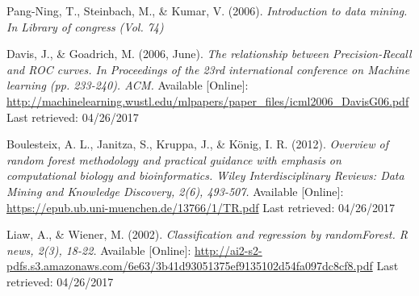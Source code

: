 \documentclass[12pt,a4paper]{article}
\begin{document}
\begin{thebibliography}{9}
		Pang-Ning, T., Steinbach, M., \& Kumar, V. (2006).  
		\textit{Introduction to data mining. In Library of congress (Vol. 74) }

		Davis, J., \& Goadrich, M. (2006, June). 
		\textit{The relationship between Precision-Recall and ROC curves. In Proceedings of the 23rd international conference on Machine learning (pp. 233-240). ACM.}
		Available [Online]: \url{http://machinelearning.wustl.edu/mlpapers/paper_files/icml2006_DavisG06.pdf} Last retrieved: 04/26/2017

		Boulesteix, A. L., Janitza, S., Kruppa, J., \& König, I. R. (2012).
		\textit{Overview of random forest methodology and practical guidance with emphasis on computational biology and bioinformatics. Wiley Interdisciplinary Reviews: Data Mining and Knowledge Discovery, 2(6), 493-507. }
		Available [Online]: \url{https://epub.ub.uni-muenchen.de/13766/1/TR.pdf} Last retrieved: 04/26/2017

		Liaw, A., \& Wiener, M. (2002). 
		\textit{Classification and regression by randomForest. R news, 2(3), 18-22.}
		Available [Online]: \url{http://ai2-s2-pdfs.s3.amazonaws.com/6e63/3b41d93051375ef9135102d54fa097dc8cf8.pdf} Last retrieved: 04/26/2017
	    
	\end{thebibliography}
\end{document}
